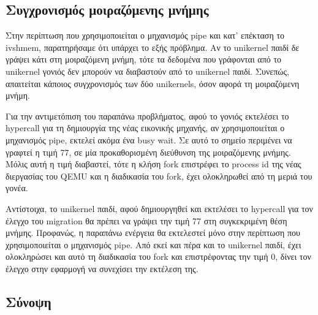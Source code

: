 \subsection{Συγχρονισμός μοιραζόμενης μνήμης}

Στην περίπτωση που χρησιμοποιείται ο μηχανισμός pipe και κατ' επέκταση το ivshmem,
παρατηρήσαμε ότι υπάρχει το εξής πρόβλημα. Αν το unikernel παιδί δε γράψει κάτι
στη μοιραζόμενη μνήμη, τότε τα δεδομένα που γράφονται από το unikernel γονιός
δεν μπορούν να διαβαστούν από το unikernel παιδί. Συνεπώς, απαιτείται κάποιος
συγχρονισμός των δύο unikernels, όσον αφορά τη μοιραζόμενη μνήμη. 

Για την αντιμετόπιση του παραπάνω προβλήματος, αφού το  γονιός
εκτελέσει το hypercall για τη δημιουργία της νέας εικονικής μηχανής, αν
χρησιμοποιείται ο μηχανισμός pipe, εκτελεί ακόμα ένα busy wait. Σε αυτό το
σημείο περιμένει να γραφτεί η τιμή 77, σε μία προκαθορισμένη διεύθυνση της
μοιραζόμενης μνήμης. Μόλις αυτή η τιμή διαβαστεί, τότε η κλήση fork επιστρέφει
το process id της νέας διεργασίας του QEMU και η διαδικασία του fork, έχει
ολοκληρωθεί από τη μεριά του γονέα. 

Αντίστοιχα, το unikernel παιδί, αφού δημιουργηθεί και εκτελέσει το hypercall για
τον έλεγχο του migration θα πρέπει να γράψει την τιμή 77 στη συγκεκριμένη θέση
μνήμης. Προφανώς, η παραπάνω ενέργεια θα εκτελεστεί μόνο στην περίπτωση που
χρησιμοποιείται ο μηχανισμός pipe. Από εκεί και πέρα και το unikernel παιδί,
έχει ολοκληρώσει και αυτό τη διαδικασία του fork και επιστρέφοντας την τιμή 0,
δίνει τον έλεγχο στην εφαρμογή να συνεχίσει την εκτέλεση της.

\subsection{Σύνοψη}

